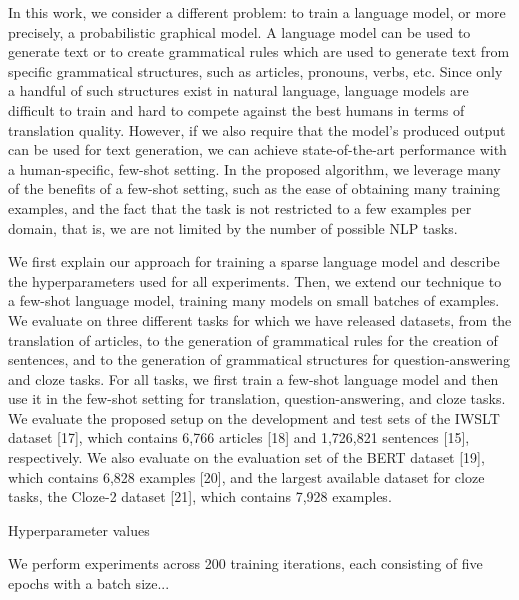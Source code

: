 \documentclass{article}
\begin{document}
In this work, we consider a different problem: to train a language model, or more precisely, a probabilistic graphical model. A language model can be used to generate text or to create grammatical rules which are used to generate text from specific grammatical structures, such as articles, pronouns, verbs, etc. Since only a handful of such structures exist in natural language, language models are difficult to train and hard to compete against the best humans in terms of translation quality. However, if we also require that the model's produced output can be used for text generation, we can achieve state-of-the-art performance with a human-specific, few-shot setting. In the proposed algorithm, we leverage many of the benefits of a few-shot setting, such as the ease of obtaining many training examples, and the fact that the task is not restricted to a few examples per domain, that is, we are not limited by the number of possible NLP tasks.

We first explain our approach for training a sparse language model and describe the hyperparameters used for all experiments. Then, we extend our technique to a few-shot language model, training many models on small batches of examples. We evaluate on three different tasks for which we have released datasets, from the translation of articles, to the generation of grammatical rules for the creation of sentences, and to the generation of grammatical structures for question-answering and cloze tasks. For all tasks, we first train a few-shot language model and then use it in the few-shot setting for translation, question-answering, and cloze tasks. We evaluate the proposed setup on the development and test sets of the IWSLT dataset [17], which contains 6,766 articles [18] and 1,726,821 sentences [15], respectively. We also evaluate on the evaluation set of the BERT dataset [19], which contains 6,828 examples [20], and the largest available dataset for cloze tasks, the Cloze-2 dataset [21], which contains 7,928 examples.

Hyperparameter values

We perform experiments across 200 training iterations, each consisting of five epochs with a batch size...
\end{document}
